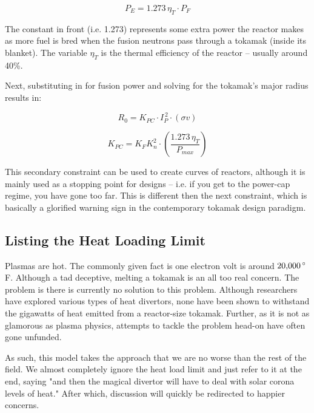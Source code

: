 \begin{equation}
	P_E = 1.273 \, \eta_T \cdot P_F
\end{equation}

The constant in front (i.e. 1.273) represents some extra power the reactor makes as more fuel is bred when the fusion neutrons pass through a tokamak (inside its blanket). The variable $\eta_T$ is the thermal efficiency of the reactor -- usually around 40\%.

Next, substituting in for fusion power and solving for the tokamak's major radius results in:

\begin{equation}
	R_0 = K_{PC} \cdot I_P^{\,2} \cdot (\sigma v)
\end{equation}

\begin{equation}
	K_{PC} = K_F K_n^2 \cdot \left( \frac{ 1.273 \, \eta_T }{ P_{max} } \right)
\end{equation}

This secondary constraint can be used to create curves of reactors, although it is mainly used as a stopping point for designs -- i.e. if you get to the power-cap regime, you have gone too far. This is different then the next constraint, which is basically a glorified warning sign in the contemporary tokamak design paradigm.

\subsection{Listing the Heat Loading Limit}

Plasmas are hot. The commonly given fact is one electron volt is around $20\textnormal{,}000 \, {}^\circ$F. Although a tad deceptive, melting a tokamak is an all too real concern. The problem is there is currently no solution to this problem. Although researchers have explored various types of heat divertors, none have been shown to withstand the gigawatts of heat emitted from a reactor-size tokamak. Further, as it is not as glamorous as plasma physics, attempts to tackle the problem head-on have often gone unfunded.

As such, this model takes the approach that we are no worse than the rest of the field. We almost completely ignore the heat load limit and just refer to it at the end, saying "and then the magical divertor will have to deal with solar corona levels of heat." After which, discussion will quickly be redirected to happier concerns.

